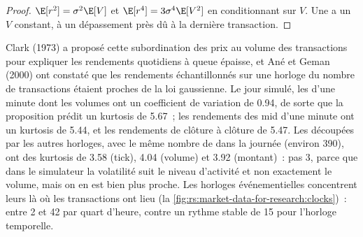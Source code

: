 \begin{proof}
$\E[r^2] = \sigma^2\E[V]$ et $\E[r^4] = 3\sigma^4\E[V^2]$ en conditionnant sur $V$. Une  a un $V$ constant, à un dépassement près dû à la
dernière transaction.
\end{proof}

Clark (1973) a proposé cette subordination des prix au volume des transactions pour expliquer les rendements quotidiens à queue épaisse, et Ané et Geman
(2000) ont constaté que les rendements échantillonnés sur une horloge du nombre de transactions étaient proches de la loi gaussienne. Le jour simulé, les  d'une minute
dont les volumes ont un coefficient de variation de 0.94, de sorte que la proposition prédit un kurtosis de 5.67~; les rendements des mid d'une minute
ont un kurtosis de 5.44, et les rendements de clôture à clôture de 5.47. Les  découpées par les autres horloges, avec le même nombre de  dans la journée (environ
390), ont des kurtosis de 3.58 (tick), 4.04 (volume) et 3.92 (montant)~: pas 3, parce que dans le simulateur la volatilité suit le
niveau d'activité et non exactement le volume, mais on en est bien plus proche. Les horloges événementielles concentrent leurs  là où les transactions ont lieu
(la \cref{fig:rs:market-data-for-research:clocks})~: entre 2 et 42  par quart d'heure, contre un rythme stable de 15 pour l'horloge temporelle.

